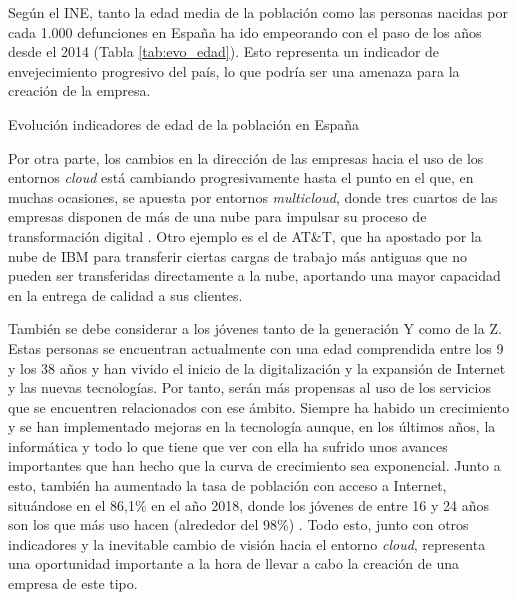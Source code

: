 Según el \acf{INE}, tanto la edad media de la población como las personas nacidas por cada 1.000 defunciones en España ha ido empeorando con el paso de los años desde el 2014 (Tabla \ref{tab:evo_edad}). Esto representa un indicador de envejecimiento progresivo del país, lo que podría ser una amenaza para la creación de la empresa.

\begin{table}[!htbp]
	\centering
	{\small
		
	}
	\caption[Evolución indicadores de edad de la población en España]
	{Evolución indicadores de edad de la población en España}
	\label{tab:evo_edad}
\end{table}

Por otra parte, los cambios en la dirección de las empresas hacia el uso de los entornos \textit{cloud} está cambiando progresivamente hasta el punto en el que, en muchas ocasiones, se apuesta por entornos \textit{multicloud}, donde tres cuartos de las empresas disponen de más de una nube para impulsar su proceso de transformación digital \cite{itusermulticloud2019}. Otro ejemplo es el de AT\&T, que ha apostado por la nube de IBM  para transferir ciertas cargas de trabajo más antiguas que no pueden ser transferidas directamente a la nube, aportando una mayor capacidad en la entrega de calidad a sus clientes. 

También se debe considerar a los jóvenes tanto de la generación Y como de la Z. Estas personas se encuentran actualmente con una edad comprendida entre los 9 y los 38 años y han vivido el inicio de la digitalización y la expansión de Internet y las nuevas tecnologías. Por tanto, serán más propensas al uso de los servicios que se encuentren relacionados con ese ámbito. Siempre ha habido un crecimiento y se han implementado mejoras en la tecnología aunque, en los últimos años, la informática y todo lo que tiene que ver con ella ha sufrido unos avances importantes que han hecho que la curva de crecimiento sea exponencial. Junto a esto, también ha aumentado la tasa de población con acceso a Internet, situándose en el 86,1\% en el año 2018, donde los jóvenes de entre 16 y 24 años son los que más uso hacen (alrededor del 98\%) \cite{ineinternet}. Todo esto, junto con otros indicadores y la inevitable cambio de visión hacia el entorno \textit{cloud}, representa una oportunidad importante a la hora de llevar a cabo la creación de una empresa de este tipo.

\clearpage


